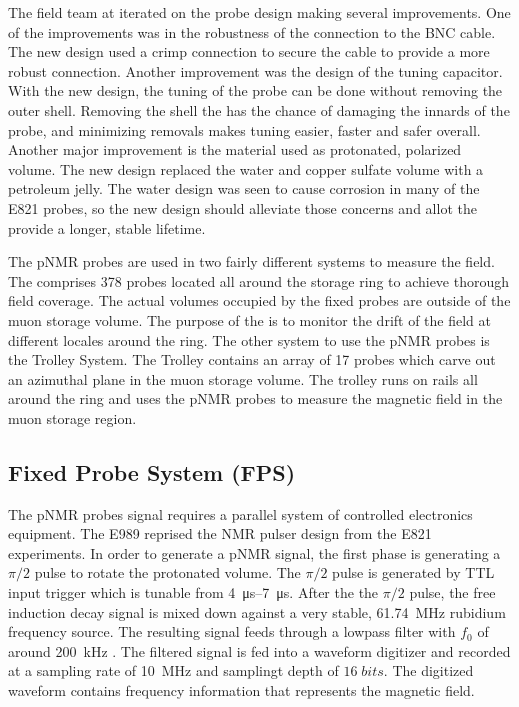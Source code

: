The field team at \uw iterated on the probe design making several improvements.  One of the improvements was in the robustness of the connection to the BNC cable.  The new design used a crimp connection to secure the cable to provide a more robust connection.  Another improvement was the design of the tuning capacitor.  With the new design, the tuning of the probe can be done without removing the outer shell.  Removing the shell the has the chance of damaging the innards of the probe, and minimizing removals makes tuning easier, faster and safer overall.  Another major improvement is the material used as protonated, polarized volume.  The new design replaced the water and copper sulfate volume with a petroleum jelly.  The water design was seen to cause corrosion in many of the E821 probes, so the new design should alleviate those concerns and allot the provide a longer, stable lifetime.


The pNMR probes are used in two fairly different systems to measure the field.  The \fps comprises 378 probes located all around the storage ring to achieve thorough field coverage.  The actual volumes occupied by the fixed probes are outside of the muon storage volume.  The purpose of the \fps is to monitor the drift of the field at different locales around the ring.  The other system to use the pNMR probes is the Trolley System. The Trolley contains an array of 17 probes which carve out an azimuthal plane in the muon storage volume.  The trolley runs on rails all around the ring and uses the pNMR probes to measure the magnetic field in the muon storage region.  

\subsection{Fixed Probe System (FPS)}

The pNMR probes signal requires a parallel system of controlled electronics equipment.  The E989 reprised the NMR pulser design from the E821 experiments.  In order to generate a pNMR signal, the first phase is generating a $\pi/2$ pulse to rotate the protonated volume.  The $\pi/2$ pulse is generated by TTL input trigger which is tunable from \SIrange{4}{7}{\micro\second}.  After the the $\pi/2$ pulse, the free induction decay signal is mixed down against a very stable, \SI{61.74}{\MHz} rubidium frequency source.  The resulting signal feeds through a lowpass filter with $f_0$ of around \SI{200}{\kHz} .  The filtered signal is fed into a waveform digitizer and recorded at a sampling rate of \SI{10}{\MHz} and samplingt depth of $16\;bits$.  The digitized waveform contains frequency information that represents the magnetic field.

